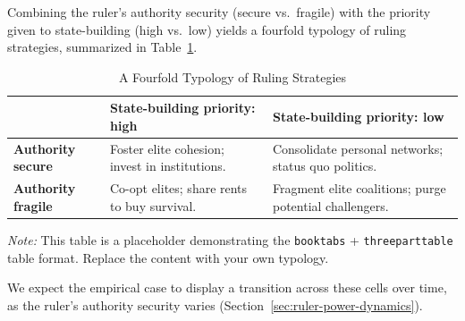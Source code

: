 
Combining the ruler's authority security (secure vs.\ fragile) with the
priority given to state-building (high vs.\ low) yields a fourfold typology of
ruling strategies, summarized in Table~\ref{tab:fourfold}.

\begin{table}[htbp]
  \centering
  \caption{A Fourfold Typology of Ruling Strategies}
  \label{tab:fourfold}
  \begin{tabular}{p{3.2cm} p{4.6cm} p{4.6cm}}
    \toprule
    & \textbf{State-building priority: high} & \textbf{State-building priority: low} \\
    \midrule
    \textbf{Authority secure}    & Foster elite cohesion;
                                   invest in institutions. &
                                   Consolidate personal networks;
                                   status quo politics. \\
    \addlinespace
    \textbf{Authority fragile}   & Co-opt elites; share rents to
                                   buy survival. &
                                   Fragment elite coalitions;
                                   purge potential challengers. \\
    \bottomrule
  \end{tabular}
  \begin{tablenotes}
    \footnotesize
    \item \textit{Note:} This table is a placeholder demonstrating the
    \texttt{booktabs} + \texttt{threeparttable} table format. Replace the
    content with your own typology.
  \end{tablenotes}
\end{table}

We expect the empirical case to display a transition across these cells over
time, as the ruler's authority security varies (Section~\ref{sec:ruler-power-dynamics}).
